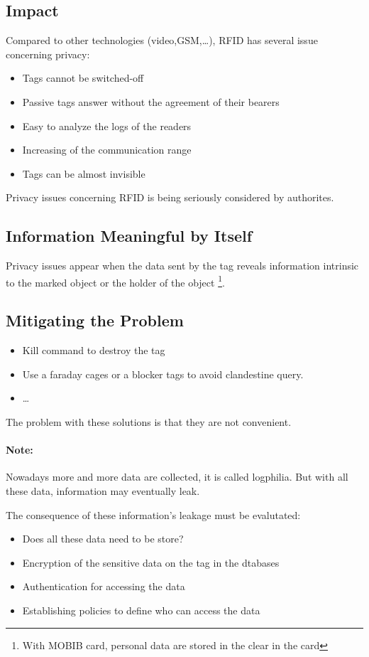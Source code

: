 
\subsection{Impact}
Compared to other technologies (video,GSM,\ldots), RFID has several issue
concerning privacy:
\begin{itemize}
    \item Tags cannot be switched-off
    \item Passive tags answer without the agreement of their bearers
    \item Easy to analyze the logs of the readers
    \item Increasing of the communication range
    \item Tags can be almost invisible
\end{itemize}
Privacy issues concerning RFID is being seriously considered by authorites.

\subsection{Information Meaningful by Itself}
Privacy issues appear when the data sent by the tag reveals information
intrinsic to the marked object or the holder of the object
\footnote{With MOBIB card, personal data are stored in the clear in the card}.

\subsection{Mitigating the Problem}
\begin{itemize}
    \item Kill command to destroy the tag
    \item Use a faraday cages or a blocker tags to
    avoid clandestine query.
    \item \ldots
\end{itemize}
The problem with these solutions is that they are not convenient.
\paragraph{Note:} Nowadays more and more data are collected, it is called
logphilia. But with all these data, information may eventually leak.

The consequence of these information's leakage must be evalutated:
\begin{itemize}
    \item Does all these data need to be store?
    \item Encryption of the sensitive data on the tag in the dtabases
    \item Authentication for accessing the data
    \item Establishing policies to define who can access the data
\end{itemize}
